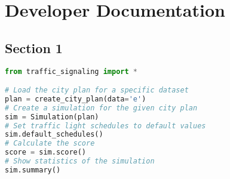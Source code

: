 \chapter{Developer Documentation} \label{chap:developer_documentation}


\section{Section 1}


\begin{lstlisting}[language=Python]
from traffic_signaling import *

# Load the city plan for a specific dataset
plan = create_city_plan(data='e')
# Create a simulation for the given city plan
sim = Simulation(plan)
# Set traffic light schedules to default values
sim.default_schedules()
# Calculate the score
score = sim.score()
# Show statistics of the simulation
sim.summary()
\end{lstlisting}